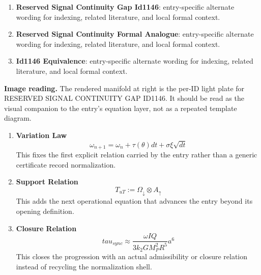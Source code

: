 \begin{enumerate}[leftmargin=1.6em,itemsep=6pt,topsep=4pt]
\item \textbf{Reserved Signal Continuity Gap Id1146}: entry-specific alternate wording for indexing, related literature, and local formal context.
\item \textbf{Reserved Signal Continuity Formal Analogue}: entry-specific alternate wording for indexing, related literature, and local formal context.
\item \textbf{Id1146 Equivalence}: entry-specific alternate wording for indexing, related literature, and local formal context.
\end{enumerate}

\begin{samepage}
\noindent\begin{minipage}[t]{0.45\linewidth}
\vspace{0pt}
\raggedright
\scriptsize\textbf{Image reading.} The rendered manifold at right is the per-ID light plate for RESERVED SIGNAL CONTINUITY GAP ID1146. It should be read as the visual companion to the entry's equation layer, not as a repeated template diagram.\par
\end{minipage}\hfill
\begin{minipage}[t]{0.53\linewidth}
\vspace*{-0.10in}
\raggedright
{}
\end{minipage}
\end{samepage}

\clearpage


\begin{enumerate}[leftmargin=1.6em,itemsep=9pt,topsep=6pt]
\item \textbf{Variation Law}
\[
\omega_{n+1} = \omega_n + \tau(\theta)dt + \sigma \xi \sqrt{dt}
\]
This fixes the first explicit relation carried by the entry rather than a generic certificate record normalization.

\item \textbf{Support Relation}
\[
T_{uT} := \Omega_{\downarrow} \otimes A_{\uparrow}
\]
This adds the next operational equation that advances the entry beyond its opening definition.

\item \textbf{Closure Relation}
\[
tau_{sync} \approx \frac{\omega I Q}{3 k_2 G M_P^2 R^5} a^6
\]
This closes the progression with an actual admissibility or closure relation instead of recycling the normalization shell.
\end{enumerate}

